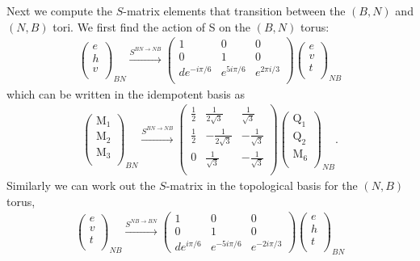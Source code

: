 \documentclass[12pt,a4paper]{article}
\newcounter{arrow}
\begin{document}
Next we compute the $S$-matrix elements that transition between the $(B,N)$ and $(N,B)$ tori.
We first find the action of S on the $(B,N)$ torus:
\begin{align}
\left( \begin{matrix}
e\\
h\\
v\\
\end{matrix} \right)_{BN} 
 \xrightarrow{S^{BN\rightarrow NB}}
\left( \begin{matrix}
1&0&0\\
0&1&0\\
d e^{-i \pi/6} & e^{5 i \pi/6}  & e^{2 \pi i /3}\\
\end{matrix} \right)
\left( \begin{matrix}
e\\
v\\
t\\
\end{matrix} \right)_{NB}
\end{align}
which can be written in the idempotent basis as
\begin{align}\left( \begin{matrix}
\text{M}_1\\
\text{M}_2\\
\text{M}_3\\
\end{matrix} \right)_{BN}
\xrightarrow{S^{BN \rightarrow NB}}
\left( \begin{matrix}
\frac{1}{2} & \frac{1}{2 \sqrt{3}} &  \frac{1}{\sqrt{3}} \\
\frac{1}{2} & - \frac{1}{2\sqrt{3}} & -\frac{1}{\sqrt{3}} \\
0& \frac{1}{\sqrt{3}} & -\frac{1}{\sqrt{3}} \\
\end{matrix} \right)
\left( \begin{matrix}
\text{Q}_1\\
\text{Q}_2\\
\text{M}_6\\
\end{matrix} \right)_{NB}.
\end{align}
Similarly we can work out the $S$-matrix in the topological basis for the $(N,B)$ torus,
\begin{align}
\left( \begin{matrix}
e \\ 
v\\ 
t\\ 
\end{matrix} \right)_{NB}
  \xrightarrow{S^{NB \rightarrow BN}}
\left( \begin{matrix}
1&0&0\\
0&1&0\\
de^{i \pi/6} & e^{-5 i \pi /6} & e^{-2 i \pi /3}
\end{matrix} \right)
\left( \begin{matrix}
e \\
h\\ 
t\\ 
\end{matrix} \right)_{BN} 
\end{align}
\end{document}
